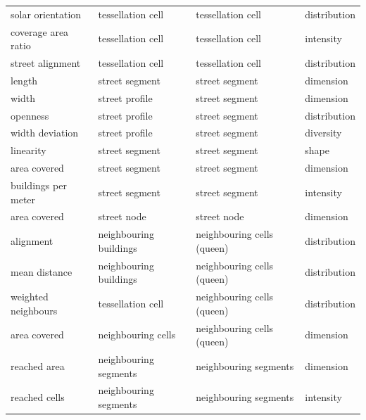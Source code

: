 \begin{longtable}{p{5cm}p{4cm}p{4cm}l}
                   solar orientation &               tessellation cell &          tessellation cell & distribution \\
                 coverage area ratio &               tessellation cell &          tessellation cell &    intensity \\
                    street alignment &               tessellation cell &          tessellation cell & distribution \\
                              length &                  street segment &             street segment &    dimension \\
                               width &                  street profile &             street segment &    dimension \\
                            openness &                  street profile &             street segment & distribution \\
                     width deviation &                  street profile &             street segment &    diversity \\
                           linearity &                  street segment &             street segment &        shape \\
                        area covered &                  street segment &             street segment &    dimension \\
                 buildings per meter &                  street segment &             street segment &    intensity \\
                        area covered &                     street node &                street node &    dimension \\
                           alignment &          neighbouring buildings & neighbouring cells (queen) & distribution \\
                       mean distance &          neighbouring buildings & neighbouring cells (queen) & distribution \\
                 weighted neighbours &               tessellation cell & neighbouring cells (queen) & distribution \\
                        area covered &              neighbouring cells & neighbouring cells (queen) &    dimension \\
                        reached area &           neighbouring segments &      neighbouring segments &    dimension \\
                       reached cells &           neighbouring segments &      neighbouring segments &    intensity \\

\end{longtable}
